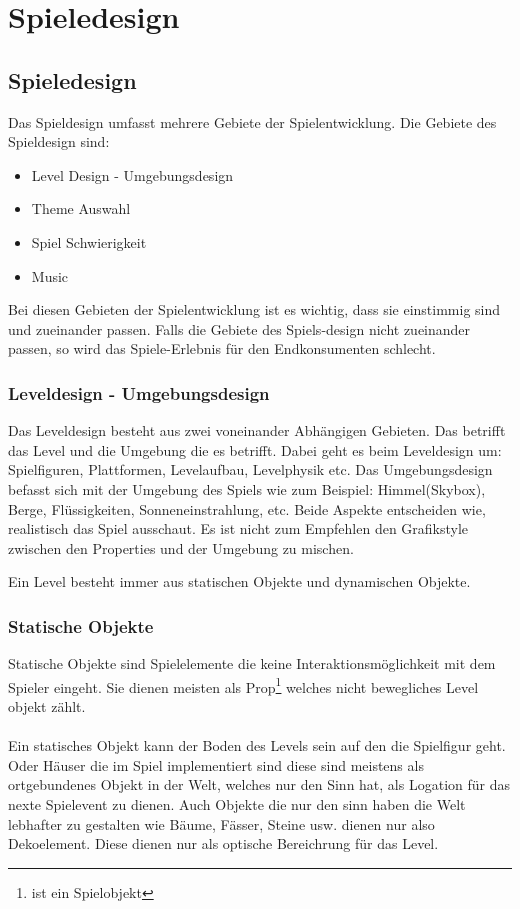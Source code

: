 \pagebreak
{}
\chapter{Spieledesign}
\section{Spieledesign}

Das Spieldesign umfasst mehrere Gebiete der Spielentwicklung. Die Gebiete des Spieldesign sind:

\begin{itemize}
    \item Level Design - Umgebungsdesign 
    \item Theme Auswahl 
    \item Spiel Schwierigkeit 
    \item Music 
\end{itemize}

Bei diesen Gebieten der Spielentwicklung ist es wichtig, dass sie einstimmig sind und zueinander passen. Falls die Gebiete des Spiels-design nicht zueinander passen, so wird das Spiele-Erlebnis für den Endkonsumenten schlecht. 

\subsection{Leveldesign - Umgebungsdesign}
Das Leveldesign besteht aus zwei voneinander Abhängigen Gebieten. Das betrifft das Level und die Umgebung die es betrifft. Dabei geht es beim Leveldesign um: Spielfiguren, Plattformen, Levelaufbau, Levelphysik etc. 
Das Umgebungsdesign befasst sich mit der Umgebung des Spiels wie zum Beispiel: Himmel(Skybox), Berge, Flüssigkeiten, Sonneneinstrahlung, etc. 
Beide Aspekte entscheiden wie, realistisch das Spiel ausschaut. Es ist nicht zum Empfehlen den Grafikstyle zwischen den Properties und der Umgebung zu mischen.

Ein Level besteht immer aus statischen Objekte und dynamischen Objekte.

\subsection{Statische Objekte}
Statische Objekte sind Spielelemente die keine Interaktionsmöglichkeit mit dem Spieler eingeht. Sie dienen meisten als Prop\footnote[1]{ist ein Spielobjekt} welches nicht bewegliches Level objekt zählt. \\\\
Ein statisches Objekt kann der Boden des Levels sein auf den die Spielfigur geht. Oder Häuser die im Spiel implementiert sind diese sind meistens als ortgebundenes Objekt in der Welt, welches nur den Sinn hat, als Logation für das nexte Spielevent zu dienen. Auch Objekte die nur den sinn haben die Welt lebhafter zu gestalten wie Bäume, Fässer, Steine usw. dienen nur also Dekoelement. Diese dienen nur als optische Bereichrung für das Level. 

